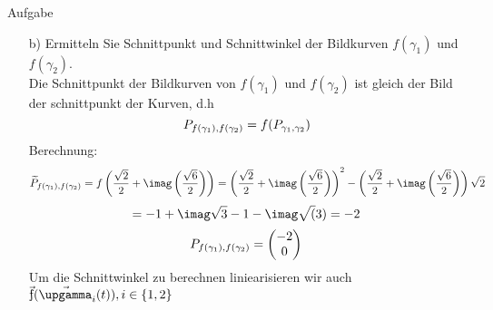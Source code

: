 \documentclass{scrartcl}
\begin{document}
\begin{section}{Aufgabe}
\begin{itemize}
\item[b)]
Ermitteln Sie Schnittpunkt und Schnittwinkel der Bildkurven $f(\gamma_1)$ und $f(\gamma_2)$.\\
Die Schnittpunkt der Bildkurven von $f(\gamma_1)$ und $f(\gamma_2)$ ist gleich der Bild der schnittpunkt der Kurven, d.h
\[\schnt{f(\gamma_1)}{f(\gamma_2)}{P}=f(\schnt{\gamma_1}{\gamma_2}{P})%
\]
Berechnung:
\[\schnt{f(\gamma_1)}{f(\gamma_2)}{\widetilde{P}}=f\left(\frac{\sqrt{2}}{2}+\imag\left(\frac{\sqrt{6}}{2}\right)\right)=\left(\frac{\sqrt{2}}{2}+\imag\left(\frac{\sqrt{6}}{2}\right)\right)^2-\left(\frac{\sqrt{2}}{2}+\imag\left(\frac{\sqrt{6}}{2}\right)\right)\sqrt{2}\]
\[=-1+\imag \sqrt{3}-1 - \imag \sqrt(3)=-2\]
\[\schnt{f(\gamma_1)}{f(\gamma_2)}{P}=\begin{pmatrix}-2\\0\end{pmatrix}\]
\newcommand{\f}{\vec{\text{\fontshape{ui}\selectfont f}}}
Um die Schnittwinkel zu berechnen liniearisieren wir auch $\f(\vec{\upgamma}_i(t)), i \in \qty{1,2}$


\end{itemize}
\end{section}
\end{document}
